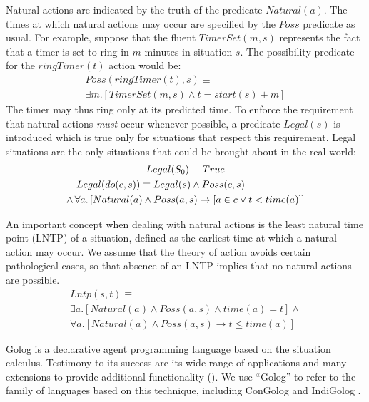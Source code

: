 \documentclass[times, 10pt, twocolumn]{article}
\begin{document}
Natural actions are indicated by the truth of the predicate $Natural(a)$.
The times at which natural actions may occur are specified by the
$Poss$ predicate as usual. For example, suppose that the fluent $TimerSet(m,s)$
represents the fact that a timer is set to ring in $m$ minutes in
situation $s$. The possibility predicate for the $ringTimer(t)$
action would be:\begin{multline*}
Poss(ringTimer(t),s)\equiv\\
\exists m.\left[TimerSet(m,s)\wedge t=start(s)+m\right]\end{multline*}
 The timer may thus ring only at its predicted time. To enforce the
requirement that natural actions \emph{must} occur whenever possible,
a predicate $Legal(s)$ is introduced which is true only for situations
that respect this requirement. Legal situations are the only situations
that could be brought about in the real world:\begin{multline*}
Legal(S_{0})\equiv True\\
\shoveleft{Legal(do(c,s))\equiv Legal(s)\wedge Poss(c,s)}\\
\wedge\,\forall a.\left[Natural(a)\wedge Poss(a,s)\rightarrow\left[a\in c\vee t<time(a)\right]\right]\end{multline*}

An important concept when dealing with natural actions is the least
natural time point (LNTP) of a situation, defined as the earliest
time at which a natural action may occur. We assume that the theory
of action avoids certain pathological cases, so that absence of an
LNTP implies that no natural actions are possible.\begin{multline*}
Lntp(s,t)\equiv\\
\exists a.\left[Natural(a)\wedge Poss(a,s)\wedge time(a)=t\right]\wedge\\
\forall a.\left[Natural(a)\wedge Poss(a,s)\rightarrow t\leq time(a)\right]\end{multline*}


Golog \cite{levesque97golog} is a declarative agent programming language
based on the situation calculus. Testimony to its success are its
wide range of applications and many extensions to provide additional
functionality (\cite{giacomo00congolog,giacomo99indigolog,Ferrein2005readylog}).
We use {}``Golog'' to refer to the family of languages based on
this technique, including ConGolog \cite{giacomo00congolog} and IndiGolog
\cite{giacomo99indigolog}.
\end{document}
